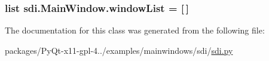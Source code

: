 \subsubsection[{window\+List}]{\setlength{\rightskip}{0pt plus 5cm}list sdi.\+Main\+Window.\+window\+List = \mbox{[}$\,$\mbox{]}\hspace{0.3cm}{\ttfamily [static]}}\label{classsdi_1_1MainWindow_a0d2ac4bfd66f5a16d0912001ce5fe31e}


The documentation for this class was generated from the following file\+:\begin{DoxyCompactItemize}
\item 
packages/\+Py\+Qt-\/x11-\/gpl-\/4../examples/mainwindows/sdi/\hyperlink{sdi_8py}{sdi.\+py}\end{DoxyCompactItemize}
